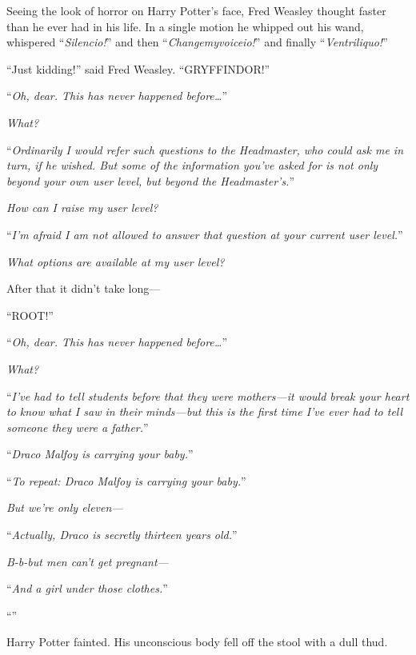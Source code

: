 Seeing the look of horror on Harry Potter’s face, Fred Weasley thought faster than he ever had in his life. In a single motion he whipped out his wand, whispered “\emph{Silencio!}” and then “\emph{Changemyvoiceio!}” and finally “\emph{Ventriliquo!}”

“Just kidding!” said Fred Weasley. “GRYFFINDOR!”

\later

“\emph{Oh, dear. This has never happened before…}”

\emph{What?}

“\emph{Ordinarily I would refer such questions to the Headmaster, who could ask me in turn, if he wished. But some of the information you’ve asked for is not only beyond your own user level, but beyond the Headmaster’s.}”

\emph{How can I raise my user level?}

“\emph{I’m afraid I am not allowed to answer that question at your current user level.}”

\emph{What options \emph{are} available at my user level?}

After that it didn’t take long—

“ROOT!”

\later

“\emph{Oh, dear. This has never happened before…}”

\emph{What?}

“\emph{I’ve had to tell students before that they were mothers—it would break your heart to know what I saw in their minds—but this is the first time I’ve ever had to tell someone they were a father.}”

\emph{}

“\emph{Draco Malfoy is carrying your baby.}”

\emph{}

“\emph{To repeat: Draco Malfoy is carrying your baby.}”

\emph{But we’re only eleven—}

“\emph{Actually, Draco is secretly thirteen years old.}”

\emph{B-b-but men can’t get pregnant—}

“\emph{And a girl under those clothes.}”

\emph{}

“\emph{}”

Harry Potter fainted. His unconscious body fell off the stool with a dull thud.

